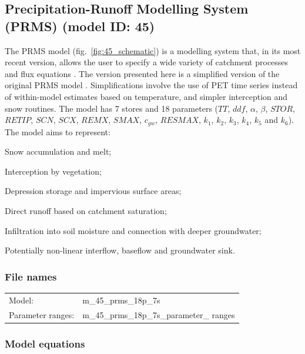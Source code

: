 \subsection{Precipitation-Runoff Modelling System (PRMS) (model ID: 45)}
The PRMS model (fig.~\ref{fig:45_schematic}) is a modelling system that, in its most recent version, allows the user to specify a wide variety of catchment processes and flux equations \citep{Markstrom2015}. The version presented here is a simplified version of the original PRMS model \citep{Leavesley1983}. Simplifications involve the use of PET time series instead of within-model estimates based on temperature, and simpler interception and snow routines. The model has 7 stores and 18 parameters ($TT$, $ddf$, $\alpha$, $\beta$, $STOR$, $RETIP$, $SCN$, $SCX$, $REMX$, $SMAX$, $c_{gw}$, $RESMAX$, $k_1$, $k_2$, $k_3$, $k_4$, $k_5$ and $k_6$). The model aims to represent:

\begin{itemizecompact}
\item Snow accumulation and melt;
\item Interception by vegetation;
\item Depression storage and impervious surface areas;
\item Direct runoff based on catchment saturation;
\item Infiltration into soil moisture and connection with deeper groundwater;
\item Potentially non-linear interflow, baseflow and groundwater sink.
\end{itemizecompact}

\subsubsection{File names}
\begin{tabular}{@{}ll}
Model: &m\_45\_prms\_18p\_7s \\
Parameter ranges: &m\_45\_prms\_18p\_7s\_parameter\_ ranges \\
\end{tabular}

\subsubsection{Model equations}

